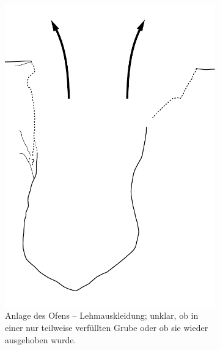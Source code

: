 \begin{figure}[!tb]
\begin{subfigure}[t]{0.32\textwidth}
		\includegraphics[width = \textwidth, page = 3]{fig/MUN87-211_Ablauf.pdf}
		\caption{Anlage des Ofens -- Lehmauskleidung; unklar, ob in einer nur teilweise verfüllten Grube oder ob sie wieder ausgehoben wurde.}
		\label{fig:MUN87.2-1-1_Sequenz_Skizze_03}
	\end{subfigure}
	\begin{subfigure}[t]{0.32\textwidth}

\end{subfigure}
\end{figure}
